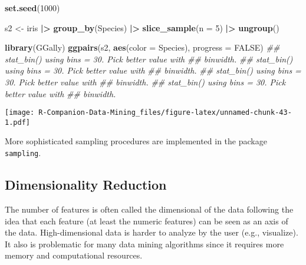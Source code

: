 \documentclass[
  notitlepage]{book}
\newenvironment{Shaded}{\begin{snugshade}}{\end{snugshade}}
\newcommand{\CommentTok}[1]{\textcolor[rgb]{0.56,0.35,0.01}{\textit{#1}}}
\newcommand{\DataTypeTok}[1]{\textcolor[rgb]{0.13,0.29,0.53}{#1}}
\newcommand{\DecValTok}[1]{\textcolor[rgb]{0.00,0.00,0.81}{#1}}
\newcommand{\ErrorTok}[1]{\textcolor[rgb]{0.64,0.00,0.00}{\textbf{#1}}}
\newcommand{\KeywordTok}[1]{\textcolor[rgb]{0.13,0.29,0.53}{\textbf{#1}}}
\newcommand{\NormalTok}[1]{#1}
\newcommand{\OperatorTok}[1]{\textcolor[rgb]{0.81,0.36,0.00}{\textbf{#1}}}
\newcommand{\OtherTok}[1]{\textcolor[rgb]{0.56,0.35,0.01}{#1}}
\newcommand{\StringTok}[1]{\textcolor[rgb]{0.31,0.60,0.02}{#1}}
\begin{document}
\begin{Shaded}
\begin{Highlighting}[]
\KeywordTok{set.seed}\NormalTok{(}\DecValTok{1000}\NormalTok{)}

\NormalTok{s2 \textless{}{-}}\StringTok{ }\NormalTok{iris }\OperatorTok{|}\ErrorTok{\textgreater{}}\StringTok{ }
\StringTok{  }\KeywordTok{group\_by}\NormalTok{(Species) }\OperatorTok{|}\ErrorTok{\textgreater{}}
\StringTok{  }\KeywordTok{slice\_sample}\NormalTok{(}\DataTypeTok{n =} \DecValTok{5}\NormalTok{) }\OperatorTok{|}\ErrorTok{\textgreater{}}
\StringTok{  }\KeywordTok{ungroup}\NormalTok{()}

\KeywordTok{library}\NormalTok{(GGally)}
\KeywordTok{ggpairs}\NormalTok{(s2, }\KeywordTok{aes}\NormalTok{(}\DataTypeTok{color =}\NormalTok{ Species), }\DataTypeTok{progress =} \OtherTok{FALSE}\NormalTok{)}
\CommentTok{\#\# \textasciigrave{}stat\_bin()\textasciigrave{} using \textasciigrave{}bins = 30\textasciigrave{}. Pick better value with}
\CommentTok{\#\# \textasciigrave{}binwidth\textasciigrave{}.}
\CommentTok{\#\# \textasciigrave{}stat\_bin()\textasciigrave{} using \textasciigrave{}bins = 30\textasciigrave{}. Pick better value with}
\CommentTok{\#\# \textasciigrave{}binwidth\textasciigrave{}.}
\CommentTok{\#\# \textasciigrave{}stat\_bin()\textasciigrave{} using \textasciigrave{}bins = 30\textasciigrave{}. Pick better value with}
\CommentTok{\#\# \textasciigrave{}binwidth\textasciigrave{}.}
\CommentTok{\#\# \textasciigrave{}stat\_bin()\textasciigrave{} using \textasciigrave{}bins = 30\textasciigrave{}. Pick better value with}
\CommentTok{\#\# \textasciigrave{}binwidth\textasciigrave{}.}
\end{Highlighting}
\end{Shaded}

\texttt{[image: R-Companion-Data-Mining\_files/figure-latex/unnamed-chunk-43-1.pdf]}

More sophisticated sampling procedures are implemented in the package
\texttt{sampling}.

\hypertarget{dimensionality-reduction}{%
\subsection{Dimensionality Reduction}\label{dimensionality-reduction}}

The number of features is often called the dimensional of the data following the
idea that each feature (at least the numeric features) can be seen as an axis of the data. High-dimensional data is harder to analyze by the user (e.g., visualize).
It also is problematic for many data mining algorithms since it requires more memory
and computational resources.
\end{document}
